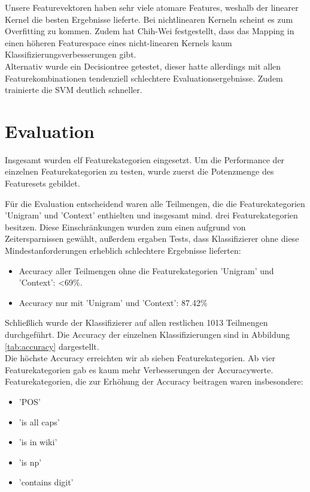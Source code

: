 \documentclass[bibliography=totoc]{scrartcl}
\begin{document}
	Unsere Featurevektoren haben sehr viele atomare Features, weshalb der linearer Kernel die besten Ergebnisse lieferte. Bei nichtlinearen Kerneln scheint es zum Overfitting zu kommen. Zudem hat Chih-Wei\cite{Chin-wei2003} festgestellt, dass das Mapping in einen höheren Featurespace eines nicht-linearen Kernels kaum Klassifizierungsverbesserungen gibt.\\
	
	Alternativ wurde ein Decisiontree getestet, dieser hatte allerdings mit
	allen Featurekombinationen tendenziell schlechtere Evaluationsergebnisse. Zudem trainierte die SVM deutlich schneller.
\section{Evaluation}
	Insgesamt wurden elf Featurekategorien eingesetzt. Um die Performance der einzelnen Featurekategorien zu testen, wurde zuerst die Potenzmenge des Featuresets gebildet.
	
	Für die Evaluation entscheidend waren alle Teilmengen, die die Featurekategorien 'Unigram' und 'Context' enthielten und insgesamt mind. drei Featurekategorien besitzen. Diese Einschränkungen wurden zum einen aufgrund von Zeitersparnissen gewählt, außerdem ergaben Tests, dass Klassifizierer ohne diese Mindestanforderungen erheblich schlechtere Ergebnisse lieferten:
				
	\begin{itemize}
	\item Accuracy aller Teilmengen ohne die Featurekategorien 'Unigram' und 'Context': \textless 69\%.
	\item Accuracy nur mit 'Unigram' und 'Context': 87.42\%
	\end{itemize}
				
	Schließlich wurde der Klassifizierer auf allen restlichen 1013 Teilmengen
	durchgeführt. Die Accuracy der einzelnen Klassifizierungen sind in Abbildung \ref{tab:accuracy} dargestellt.\\
	Die höchste Accuracy erreichten wir ab sieben Featurekategorien. Ab vier Featurekategorien gab es kaum mehr Verbesserungen der Accuracywerte. Featurekategorien, die zur Erhöhung der Accuracy beitragen waren insbesondere:
	\begin{itemize}
		\item ’POS’
		\item ’is all caps’
		\item ’is in wiki’
		\item ’is np’
		\item ’contains digit’
	\end{itemize}
	
\end{document}
